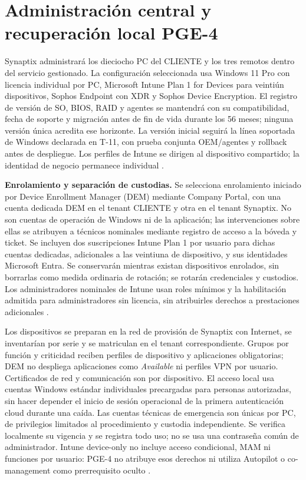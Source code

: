 \section{Administración central y recuperación local PGE-4}
\label{sec:sd4-pge4-gestion}
Synaptix administrará los dieciocho PC del CLIENTE y los tres remotos dentro del servicio gestionado. La configuración seleccionada usa Windows 11 Pro con licencia individual por PC, Microsoft Intune Plan 1 for Devices para veintiún dispositivos, Sophos Endpoint con XDR y Sophos Device Encryption. El registro de versión de SO, BIOS, RAID y agentes se mantendrá con su compatibilidad, fecha de soporte y migración antes de fin de vida durante los 56 meses; ninguna versión única acredita ese horizonte. La versión inicial seguirá la línea soportada de Windows declarada en T-11, con prueba conjunta OEM/agentes y rollback antes de despliegue. Los perfiles de Intune se dirigen al dispositivo compartido; la identidad de negocio permanece individual \parencites{p4-windows-versiones,p4-intune-licencias,p4-sophos-cifrado,p4-sophos-politica-cifrado}.

\textbf{Enrolamiento y separación de custodias.} Se selecciona enrolamiento iniciado por Device Enrollment Manager (DEM) mediante Company Portal, con una cuenta dedicada DEM en el tenant CLIENTE y otra en el tenant Synaptix. No son cuentas de operación de Windows ni de la aplicación; las intervenciones sobre ellas se atribuyen a técnicos nominales mediante registro de acceso a la bóveda y ticket. Se incluyen dos suscripciones Intune Plan 1 por usuario para dichas cuentas dedicadas, adicionales a las veintiuna de dispositivo, y sus identidades Microsoft Entra. Se conservarán mientras existan dispositivos enrolados, sin borrarlas como medida ordinaria de rotación; se rotarán credenciales y custodios. Los administradores nominales de Intune usan roles mínimos y la habilitación admitida para administradores sin licencia, sin atribuirles derechos a prestaciones adicionales \parencites{p15-intune-dem,p4-intune-licencias}.

Los dispositivos se preparan en la red de provisión de Synaptix con Internet, se inventarían por serie y se matriculan en el tenant correspondiente. Grupos por función y criticidad reciben perfiles de dispositivo y aplicaciones obligatorias; DEM no despliega aplicaciones como \textit{Available} ni perfiles VPN por usuario. Certificados de red y comunicación son por dispositivo. El acceso local usa cuentas Windows estándar individuales precargadas para personas autorizadas, sin hacer depender el inicio de sesión operacional de la primera autenticación cloud durante una caída. Las cuentas técnicas de emergencia son únicas por PC, de privilegios limitados al procedimiento y custodia independiente. Se verifica localmente su vigencia y se registra todo uso; no se usa una contraseña común de administrador. Intune device-only no incluye acceso condicional, MAM ni funciones por usuario: PGE-4 no atribuye esos derechos ni utiliza Autopilot o co-management como prerrequisito oculto \parencites{p15-intune-dem,p4-intune-licencias}.

